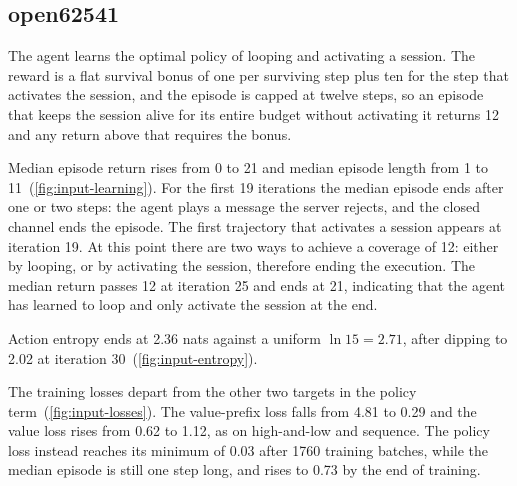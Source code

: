 \subsection{open62541}\label{sec:results-open62541}

The agent learns the optimal policy of looping and activating a session.
The reward is a flat survival bonus of one per surviving step plus ten for the step that
activates the session, and the episode is capped at twelve steps, so an episode that keeps
the session alive for its entire budget without activating it returns \num{12} and any return
above that requires the bonus.

Median episode return rises from \num{0} to \num{21} and median episode length from 1 to
11~(\cref{fig:input-learning}).
For the first 19 iterations the median episode ends after one or two steps: the agent plays a
message the server rejects, and the closed channel ends the episode.
The first trajectory that activates a session appears at iteration 19.
At this point there are two ways to achieve a coverage of \num{12}: either by looping,
or by activating the session, therefore ending the execution.
The median return passes \num{12} at iteration 25 and ends at \num{21},
indicating that the agent has learned to loop and only activate the session at the end.

Action entropy ends at \num{2.36} nats against a uniform $\ln 15 = \num{2.71}$, after dipping to
\num{2.02} at iteration 30~(\cref{fig:input-entropy}).

The training losses depart from the other two targets in the policy term~(\cref{fig:input-losses}).
The value-prefix loss falls from \num{4.81} to \num{0.29} and the value loss rises from
\num{0.62} to \num{1.12}, as on high-and-low and sequence.
The policy loss instead reaches its minimum of \num{0.03} after 1760 training batches, while the
median episode is still one step long, and rises to \num{0.73} by the end of training.
